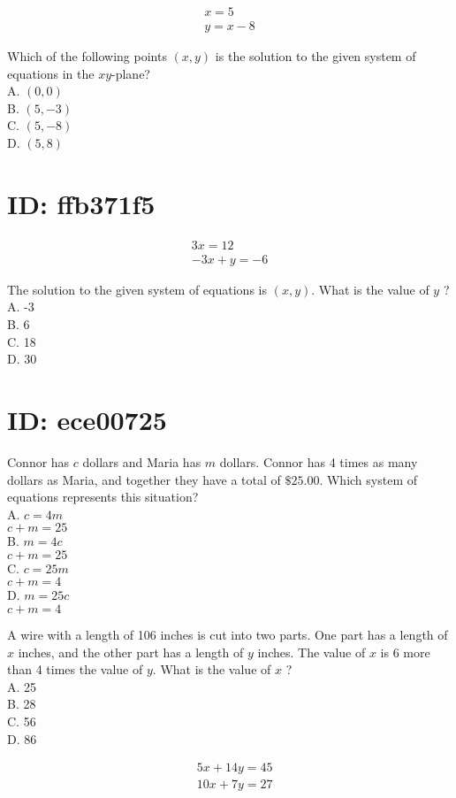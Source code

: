 $$
\begin{gathered}
x=5 \\
y=x-8
\end{gathered}
$$

Which of the following points $(x, y)$ is the solution to the given system of equations in the $x y$-plane?\\
A. $(0,0)$\\
B. $(5,-3)$\\
C. $(5,-8)$\\
D. $(5,8)$

\section*{ID: ffb371f5}
$$
\begin{gathered}
3 x=12 \\
-3 x+y=-6
\end{gathered}
$$

The solution to the given system of equations is $(x, y)$. What is the value of $y$ ?\\
A. -3\\
B. 6\\
C. 18\\
D. 30

\section*{ID: ece00725}
Connor has $c$ dollars and Maria has $m$ dollars. Connor has 4 times as many dollars as Maria, and together they have a total of $\$ 25.00$. Which system of equations represents this situation?\\
A. $c=4 m$\\
$c+m=25$\\
B. $m=4 c$\\
$c+m=25$\\
C. $c=25 m$\\
$c+m=4$\\
D. $m=25 c$\\
$c+m=4$

A wire with a length of 106 inches is cut into two parts. One part has a length of $x$ inches, and the other part has a length of $y$ inches. The value of $x$ is 6 more than 4 times the value of $y$. What is the value of $x$ ?\\
A. 25\\
B. 28\\
C. 56\\
D. 86

$$
\begin{aligned}
& 5 x+14 y=45 \\
& 10 x+7 y=27
\end{aligned}
$$


